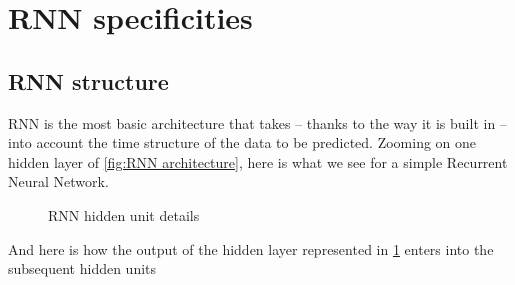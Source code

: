 \section{RNN specificities}

\subsection{RNN structure} \label{sec:rnnstructure}

RNN is the most basic architecture that takes -- thanks to the way it is built in -- into account the time structure of the data to be predicted. Zooming on one hidden layer of \ref{fig:RNN architecture}, here is what we see for a simple Recurrent Neural Network.

\begin{figure}[H]
\begin{center}
\caption{\label{fig:RNN hidden unit}RNN hidden unit details}
\end{center}
\end{figure}

And here is how the output of the hidden layer represented in \ref{fig:RNN hidden unit} enters into the subsequent hidden units

